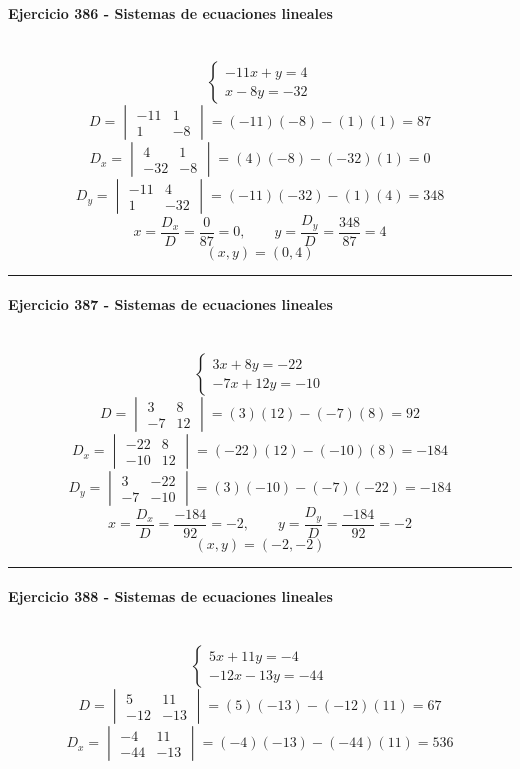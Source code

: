 \documentclass[10pt,a4paper]{article}
\newcommand{\res}[1]{\paragraph{#1}\mbox{}\\[-1.2em]}
\begin{document}
\res{Ejercicio 386 - Sistemas de ecuaciones lineales}
\[ \begin{cases}- 11 x + y=4\\x - 8 y=-32\end{cases} \]
\[ D=\begin{vmatrix}-11&1\\1&-8\end{vmatrix}=(-11)(-8)-(1)(1)=87 \]
\[ D_x=\begin{vmatrix}4&1\\-32&-8\end{vmatrix}=(4)(-8)-(-32)(1)=0 \]
\[ D_y=\begin{vmatrix}-11&4\\1&-32\end{vmatrix}=(-11)(-32)-(1)(4)=348 \]
\[ x=\frac{D_x}{D}=\frac{0}{87}=0,\qquad y=\frac{D_y}{D}=\frac{348}{87}=4 \]
\[ \boxed{(x,y)=(0,4)} \]
\vspace{1mm}\hrule\vspace{2mm}
\res{Ejercicio 387 - Sistemas de ecuaciones lineales}
\[ \begin{cases}3 x + 8 y=-22\\- 7 x + 12 y=-10\end{cases} \]
\[ D=\begin{vmatrix}3&8\\-7&12\end{vmatrix}=(3)(12)-(-7)(8)=92 \]
\[ D_x=\begin{vmatrix}-22&8\\-10&12\end{vmatrix}=(-22)(12)-(-10)(8)=-184 \]
\[ D_y=\begin{vmatrix}3&-22\\-7&-10\end{vmatrix}=(3)(-10)-(-7)(-22)=-184 \]
\[ x=\frac{D_x}{D}=\frac{-184}{92}=-2,\qquad y=\frac{D_y}{D}=\frac{-184}{92}=-2 \]
\[ \boxed{(x,y)=(-2,-2)} \]
\vspace{1mm}\hrule\vspace{2mm}
\res{Ejercicio 388 - Sistemas de ecuaciones lineales}
\[ \begin{cases}5 x + 11 y=-4\\- 12 x - 13 y=-44\end{cases} \]
\[ D=\begin{vmatrix}5&11\\-12&-13\end{vmatrix}=(5)(-13)-(-12)(11)=67 \]
\[ D_x=\begin{vmatrix}-4&11\\-44&-13\end{vmatrix}=(-4)(-13)-(-44)(11)=536 \]
\end{document}

